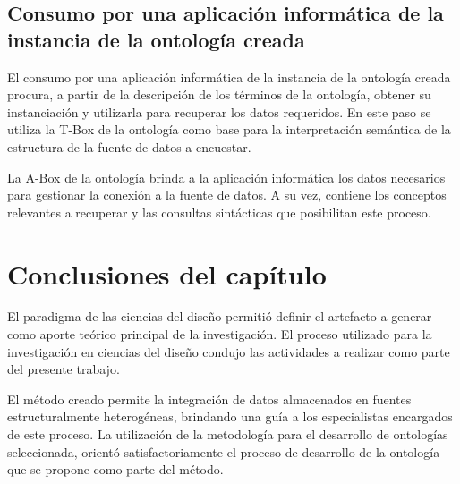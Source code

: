\subsection{Consumo por una aplicación informática de la instancia de la ontología creada}

El consumo por una aplicación informática de la instancia de la ontología creada procura, a partir de la descripción de los términos de la ontología, obtener su instanciación y utilizarla para recuperar los datos requeridos. En este paso se utiliza la T-Box de la ontología como base para la interpretación semántica de la estructura de la fuente de datos a encuestar.

La A-Box de la ontología brinda a la aplicación informática los datos necesarios para gestionar la conexión a la fuente de datos. A su vez, contiene los conceptos relevantes a recuperar y las consultas sintácticas que posibilitan este proceso.

\section{Conclusiones del capítulo}

El paradigma de las ciencias del diseño permitió definir el artefacto a generar como aporte teórico principal de la investigación. El proceso utilizado para la investigación en ciencias del diseño condujo las actividades a realizar como parte del presente trabajo.

El método creado permite la integración de datos almacenados en fuentes estructuralmente heterogéneas, brindando una guía a los especialistas encargados de este proceso. La utilización de la metodología para el desarrollo de ontologías seleccionada, orientó satisfactoriamente el proceso de desarrollo de la ontología que se propone como parte del método.





